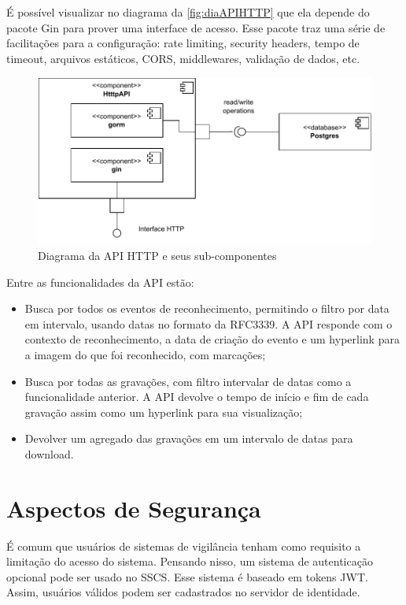 \documentclass[12pt, %
openright, 
oneside, %
a4paper,    %
brazil]{facom-ufu-abntex2}
\begin{document}
É possível visualizar no diagrama da \autoref{fig:diaAPIHTTP} que ela depende
do pacote Gin para prover uma interface de acesso. Esse pacote traz uma série
de facilitações para a configuração: rate limiting, security headers, tempo de
timeout, arquivos estáticos, CORS, middlewares, validação de dados, etc.

\begin{figure}[!ht]
	\centering
	\includegraphics[width=0.8\linewidth]{api_http.pdf}
	\caption[Diagrama da implementação da API HTTP]{Diagrama da API HTTP e
		seus sub-componentes}
	\label{fig:diaAPIHTTP}
\end{figure}

Entre as funcionalidades da API estão:
\begin{itemize}
	\item Busca por todos os eventos de reconhecimento, permitindo o filtro
	      por data em intervalo, usando datas no formato da RFC3339. A API responde com o
	      contexto de reconhecimento, a data de criação do evento e um hyperlink para a
	      imagem do que foi reconhecido, com marcações;
	\item Busca por todas as gravações, com filtro intervalar de datas como
	      a funcionalidade anterior. A API devolve o tempo de início e fim de cada
	      gravação assim como um hyperlink para sua visualização;
	\item Devolver um agregado das gravações em um intervalo de datas para
	      download.
\end{itemize}

\section{Aspectos de Segurança}

É comum que usuários de sistemas de vigilância tenham como requisito a
limitação do acesso do sistema. Pensando nisso, um sistema de autenticação
opcional pode ser usado no SSCS. Esse sistema é baseado em tokens JWT. Assim,
usuários válidos podem ser cadastrados no servidor de identidade.
\end{document}
